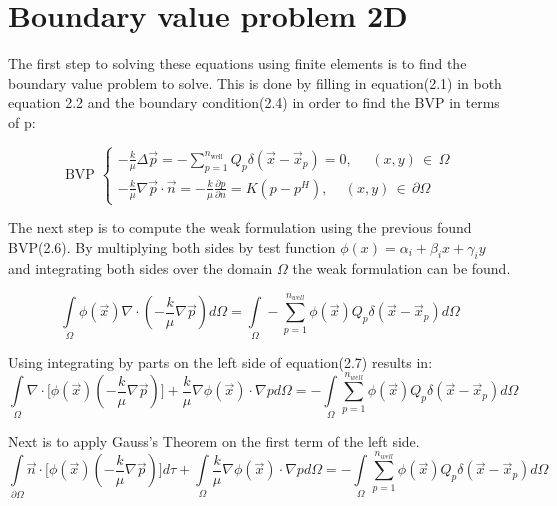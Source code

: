 \documentclass[a4paper]{report}
\begin{document}
\section{Boundary value problem 2D}
The first step to solving these equations using finite elements is to find the boundary value problem to solve. This is done by filling in equation(2.1) in both equation 2.2 and the boundary condition(2.4) in order to find the BVP in terms of p:
\vspace{5mm}


\begin{equation}
\text{BVP  }
	\begin{cases}
		-\frac{k}{\mu}\Delta\vec{p}=-\sum\limits_{p=1}^{n_{\text{well}}}Q_p\delta(\vec{x}-\vec{x}_p)=0,\, \, \quad (x,y) \, \in \, \Omega\\
		-\frac{k}{\mu}\nabla\vec{p}\cdot\vec{n}=-\frac{k}{\mu}\frac{\partial p}{\partial n} =K(p-p^H), \, \quad (x,y)\,  \in  \, \partial\Omega
	\end{cases}
\end{equation}

\bigskip

The next step is to compute the weak formulation using the previous found BVP(2.6). By multiplying both sides by test function $\phi(x) = \alpha_i + \beta_i x + \gamma_i y$ and integrating both sides over the domain $\Omega$ the weak formulation can be found.

\begin{equation}
	\int\limits_{\Omega}\phi(\vec{x})\nabla\cdot( -\frac{k}{\mu}\nabla\vec{p}) d\Omega =\int\limits_{\Omega}-\sum_{p=1}^{n_{well}}\phi(\vec{x})  Q_p\delta(\vec{x}-\vec{x}_p)d\Omega
\end{equation}

Using integrating by parts on the left side of equation(2.7) results in:
\begin{equation}
	\int\limits_{\Omega}\nabla\cdot \big[\phi(\vec{x})(-\frac{k}{\mu}\nabla\vec{p})] +\frac{k}{\mu}\nabla\phi(\vec{x})\cdot\nabla p d\Omega= -\int\limits_{\Omega}\sum_{p=1}^{n_{well}}\phi(\vec{x}) Q_p\delta(\vec{x}-\vec{x}_p)d\Omega
\end{equation}

Next is to apply Gauss's Theorem on the first term of the left side.
\begin{equation}
	\int\limits_{\partial\Omega}\vec{n}\cdot\big[\phi(\vec{x})(-\frac{k}{\mu}\nabla\vec{p})\big]d\tau+\int\limits_{\Omega}\frac{k}{\mu}\nabla\phi(\vec{x})\cdot\nabla p d\Omega= -\int\limits_{\Omega}\sum_{p=1}^{n_{well}}\phi(\vec{x}) Q_p\delta(\vec{x}-\vec{x}_p)d\Omega
\end{equation}
\end{document}
